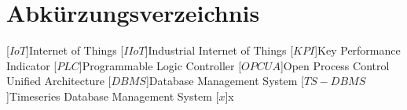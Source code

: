 \clearpage
\chapter*{Abkürzungsverzeichnis}\label{abkuerzungsverzeichnis}
\begin{acronym}[YTM]
\setlength{\itemsep}{-\parsep}

[$IoT$]{\hspace{1cm}Internet of Things}
[$IIoT$]{\hspace{1cm}Industrial Internet of Things}
[$KPI$]{\hspace{1cm}Key Performance Indicator}
[$PLC$]{\hspace{1cm}Programmable Logic Controller}
[$OPC UA$]{\hspace{1cm}Open Process Control Unified Architecture}
[$DBMS$]{\hspace{1cm}Database Management System}
[$TS-DBMS$]{\hspace{1cm}Timeseries Database Management System}
\acro{}[$x$]{\hspace{1cm}x}


\end{acronym}
